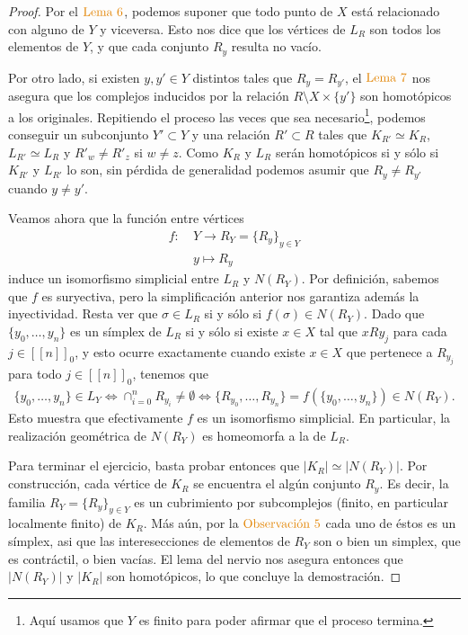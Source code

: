 \documentclass[11pt]{article}
\newcommand{\nat}[1]{[\![#1]\!]}
\newcommand{\natzero}[1]{\nat{#1}_0}
\newcommand{\paint}[1]{\color{color}{#1}}
\begin{document}
\begin{proof} Por el $\paint{\text{Lema $6$}}$, podemos suponer que todo punto de $X$ est\'a relacionado con alguno de $Y$ y viceversa. Esto nos dice que los v\'ertices de $L_R$ son todos los elementos de $Y$, y que cada conjunto $R_y$ resulta no vac\'io.

Por otro lado, si existen $y,y' \in Y$ distintos tales que $R_y = R_{y'}$, el $\paint{\text{Lema $7$}}$ nos asegura que los complejos inducidos por la relaci\'on $R \setminus X \times \{y'\}$ son homot\'opicos a los originales. Repitiendo el proceso las veces que sea necesario\footnote{Aqu\'i usamos que $Y$ es finito para poder afirmar que el proceso termina.}, podemos conseguir un subconjunto $Y' \subset Y$ y una relaci\'on $R' \subset R$ tales que $K_{R'} \simeq K_R$, $L_{R'} \simeq L_R$  y $R'_w \neq R'_z$ si $w \neq z$. Como $K_R$ y $L_R$ ser\'an homot\'opicos si y s\'olo si $K_{R'}$ y $L_{R'}$ lo son, sin p\'erdida de generalidad podemos asumir que $R_{y} \neq R_{y'}$ cuando $y \neq y'$.

Veamos ahora que la funci\'on entre v\'ertices
\begin{align*}
f : \ &Y \to R_Y = \{R_y\}_{y \in Y}\\
& y \mapsto R_y
\end{align*}
induce un isomorfismo simplicial entre $L_R$ y $N(R_Y)$. Por definici\'on, sabemos que $f$ es suryectiva, pero la simplificaci\'on anterior nos garantiza adem\'as la inyectividad. Resta ver que $\sigma \in L_R$ si y s\'olo si $f(\sigma) \in N(R_Y)$. Dado que $\{y_0, \dots, y_n\}$ es un s\'implex de  $L_R$ si y s\'olo si existe $x \in X$ tal que $xRy_j$ para cada $j \in \natzero{n}$, y esto ocurre exactamente cuando existe $x \in X$  que pertenece a $R_{y_j}$ para todo $j \in \natzero{n}$, tenemos que
\begin{align*}
\{y_0,\dots,y_n\} \in L_Y \iff \cap_{i=0}^nR_{y_i} \neq \emptyset \iff \{R_{y_0}, \dots, R_{y_n}\} = f(\{y_0,\dots,y_n\}) \in N(R_Y).
\end{align*} 
Esto muestra que efectivamente $f$ es un isomorfismo simplicial. En particular, la realizaci\'on geom\'etrica de $N(R_Y)$ es homeomorfa a la de $L_R$.

Para terminar el ejercicio, basta probar entonces que $|K_R| \simeq |N(R_Y)|$. Por construcci\'on, cada v\'ertice de $K_R$ se encuentra el alg\'un conjunto $R_y$. Es decir, la familia $R_Y = \{R_y\}_{y \in Y}$ es un cubrimiento por subcomplejos (finito, en particular localmente finito) de $K_R$. M\'as a\'un, por la $\paint{\text{Observaci\'on $5$}}$ cada uno de \'estos es un s\'implex, asi que las interesecciones de elementos de $R_Y$ son o bien un simplex, que es contr\'actil, o bien vac\'ias. El lema del nervio nos asegura entonces que $|N(R_Y)|$ y $|K_R|$ son homot\'opicos, lo que concluye la demostraci\'on.
\end{proof}
\end{document}
